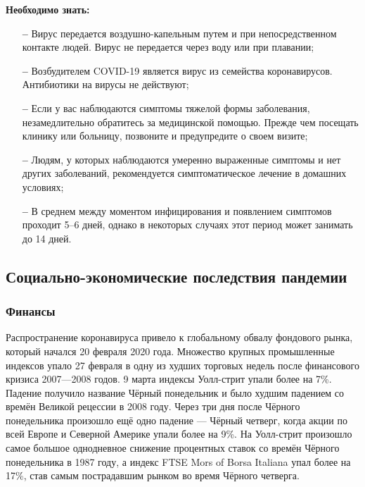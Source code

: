 \documentclass[a4paper, 12pt]{extarticle}
\begin{document}
\vspace{5mm}

\textbf{Необходимо знать:}
\begin{itemize}
    \item[\bfseries--] Вирус передается воздушно-капельным путем и при непосредственном
        контакте людей. Вирус не передается через воду или при плавании;
    \item[\bfseries--] Возбудителем COVID-19 является вирус из семейства коронавирусов.
        Антибиотики на вирусы не действуют;
    \item[\bfseries--] Если у вас наблюдаются симптомы тяжелой формы заболевания,
        незамедлительно обратитесь за медицинской помощью. Прежде чем посещать
        клинику или больницу, позвоните и предупредите о своем визите;
    \item[\bfseries--] Людям, у которых наблюдаются умеренно выраженные симптомы и нет
        других заболеваний, рекомендуется симптоматическое лечение в домашних
        условиях;
    \item[\bfseries--] В среднем между моментом инфицирования и появлением симптомов
        проходит 5–6 дней, однако в некоторых случаях этот период может
        занимать до 14 дней.
\end{itemize}
\newpage

\subsection{Социально-экономические последствия пандемии}
\subsubsection{Финансы}

Распространение коронавируса привело к глобальному обвалу фондового рынка,
который начался 20 февраля 2020 года. Множество крупных промышленные индексов
упало 27 февраля в одну из худших торговых недель после финансового кризиса
2007—2008 годов. 9 марта индексы Уолл-стрит упали более на 7\%. Падение
получило название Чёрный понедельник и было худшим падением со времён Великой
рецессии в 2008 году. Через три дня после Чёрного понедельника произошло ещё
одно падение — Чёрный четверг, когда акции по всей Европе и Северной Америке
упали более на 9\%. На Уолл-стрит произошло самое большое однодневное снижение
процентных ставок со времён Чёрного понедельника в 1987 году, а индекс FTSE
Mors of Borsa Italiana упал более на 17\%, став самым пострадавшим рынком во время Чёрного четверга.
\end{document}
